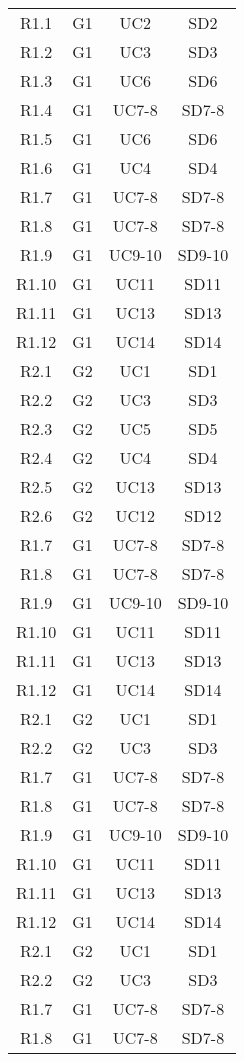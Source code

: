 \begin{longtable}{cccc}
    R1.1 & G1 & UC2    & SD2  \\
    R1.2 & G1 & UC3    & SD3  \\
    R1.3 & G1 & UC6    & SD6  \\
    R1.4 & G1 & UC7-8  & SD7-8 \\
    R1.5 & G1 & UC6    & SD6  \\
    R1.6 & G1 & UC4    & SD4  \\
    R1.7 & G1 & UC7-8  & SD7-8 \\
    R1.8 & G1 & UC7-8  & SD7-8 \\
    R1.9 & G1 & UC9-10 & SD9-10 \\
    R1.10 & G1 & UC11  & SD11 \\
    R1.11 & G1 & UC13  & SD13 \\
    R1.12 & G1 & UC14  & SD14 \\
    R2.1 & G2 & UC1    & SD1  \\
    R2.2 & G2 & UC3    & SD3  \\
    R2.3 & G2 & UC5    & SD5  \\
    R2.4 & G2 & UC4    & SD4  \\
    R2.5 & G2 & UC13   & SD13 \\
    R2.6 & G2 & UC12   & SD12 \\
    R1.7 & G1 & UC7-8  & SD7-8 \\
    R1.8 & G1 & UC7-8  & SD7-8 \\
    R1.9 & G1 & UC9-10 & SD9-10 \\
    R1.10 & G1 & UC11  & SD11 \\
    R1.11 & G1 & UC13  & SD13 \\
    R1.12 & G1 & UC14  & SD14 \\
    R2.1 & G2 & UC1    & SD1  \\
    R2.2 & G2 & UC3    & SD3  \\
    R1.7 & G1 & UC7-8  & SD7-8 \\
    R1.8 & G1 & UC7-8  & SD7-8 \\
    R1.9 & G1 & UC9-10 & SD9-10 \\
    R1.10 & G1 & UC11  & SD11 \\
    R1.11 & G1 & UC13  & SD13 \\
    R1.12 & G1 & UC14  & SD14 \\
    R2.1 & G2 & UC1    & SD1  \\
    R2.2 & G2 & UC3    & SD3  \\
    R1.7 & G1 & UC7-8  & SD7-8 \\
    R1.8 & G1 & UC7-8  & SD7-8 \\

\end{longtable}
